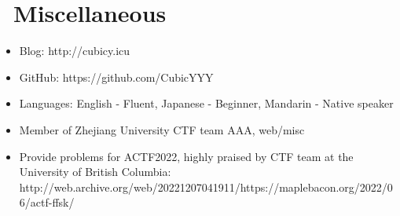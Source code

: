 \documentclass{resume}
\begin{document}
\section{\faInfo\ Miscellaneous}
\begin{itemize}[parsep=0.5ex]
  \item Blog: http://cubicy.icu
  \item GitHub: https://github.com/CubicYYY
  \item Languages: English - Fluent, Japanese - Beginner, Mandarin - Native speaker
  \item Member of Zhejiang University CTF team AAA, web/misc
  \item Provide problems for ACTF2022, highly praised by CTF team at the University of British Columbia: http://web.archive.org/web/20221207041911/https://maplebacon.org/2022/06/actf-ffsk/
\end{itemize}

%
%
\end{document}
